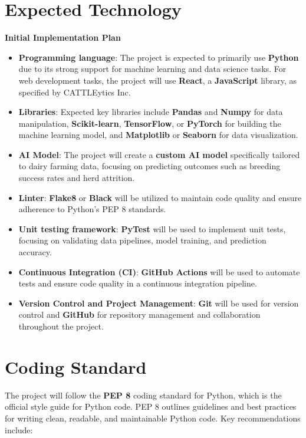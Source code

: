 \documentclass{article}
\begin{document}
\section{Expected Technology}
\textbf{Initial Implementation Plan}

\begin{itemize}
    \item \textbf{Programming language}: 
    The project is expected to primarily use \textbf{Python} due to its strong support for machine learning and data science tasks. For web development tasks, the project will use \textbf{React}, a \textbf{JavaScript} library, as specified by CATTLEytics Inc. 
    \item \textbf{Libraries}: 
    Expected key libraries include \textbf{Pandas} and \textbf{Numpy} for data manipulation, \textbf{Scikit-learn}, \textbf{TensorFlow}, or \textbf{PyTorch} for building the machine learning model, and \textbf{Matplotlib} or \textbf{Seaborn} for data visualization.
    \item \textbf{AI Model}: 
    The project will create a \textbf{custom AI model} specifically tailored to dairy farming data, focusing on predicting outcomes such as breeding success rates and herd attrition.
    \item \textbf{Linter}: 
    \textbf{Flake8} or \textbf{Black} will be utilized to maintain code quality and ensure adherence to Python's PEP 8 standards.
    \item \textbf{Unit testing framework}: 
    \textbf{PyTest} will be used to implement unit tests, focusing on validating data pipelines, model training, and prediction accuracy.
    \item \textbf{Continuous Integration (CI)}: 
    \textbf{GitHub Actions} will be used to automate tests and ensure code quality in a continuous integration pipeline.
    \item \textbf{Version Control and Project Management}: 
    \textbf{Git} will be used for version control and \textbf{GitHub} for repository management and collaboration throughout the project.
\end{itemize}

\section{Coding Standard}

The project will follow the \textbf{PEP 8} coding standard for Python, which is the official style guide for Python code. PEP 8 outlines guidelines and best practices for writing clean, readable, and maintainable Python code. Key recommendations include:
\end{document}
